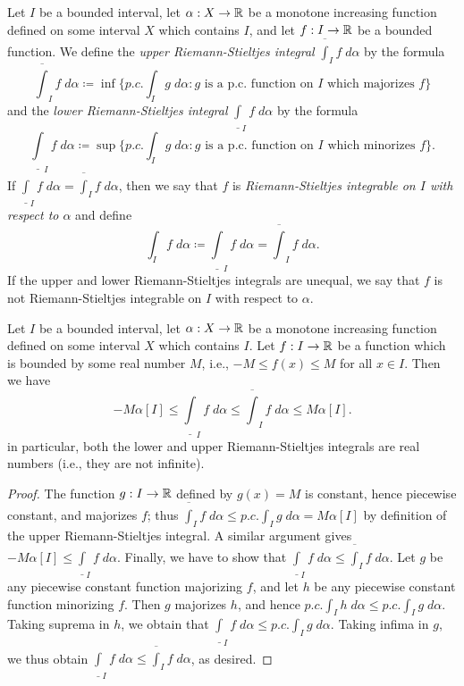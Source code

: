 \begin{ac}\label{ac:11.8.8}
  Let \(I\) be a bounded interval, let \(\alpha : X \to \mathbb{R}\) be a monotone increasing function defined on some interval \(X\) which contains \(I\), and let \(f : I \to \mathbb{R}\) be a bounded function.
  We define the \emph{upper Riemann-Stieltjes integral} \(\overline{\int}_I f \; d \alpha\) by the formula
  \[
    \overline{\int}_I f \; d \alpha \coloneqq \inf\bigg\{p.c. \int_I g \; d \alpha : g \text{ is a p.c. function on \(I\) which majorizes } f\bigg\}
  \]
  and the \emph{lower Riemann-Stieltjes integral} \(\underline{\int}_I f \; d \alpha\) by the formula
  \[
    \underline{\int}_I f \; d \alpha \coloneqq \sup\bigg\{p.c. \int_I g \; d \alpha : g \text{ is a p.c. function on \(I\) which minorizes } f\bigg\}.
  \]
  If \(\underline{\int}_I f \; d \alpha = \overline{\int}_I f \; d \alpha\), then we say that \(f\) is \emph{Riemann-Stieltjes integrable on \(I\) with respect to \(\alpha\)} and define
  \[
    \int_I f \; d \alpha \coloneqq \underline{\int}_I f \; d \alpha = \overline{\int}_I f \; d \alpha.
  \]
  If the upper and lower Riemann-Stieltjes integrals are unequal, we say that \(f\) is not Riemann-Stieltjes integrable on \(I\) with respect to \(\alpha\).
\end{ac}

\begin{ac}\label{ac:11.8.9}
  Let \(I\) be a bounded interval, let \(\alpha : X \to \mathbb{R}\) be a monotone increasing function defined on some interval \(X\) which contains \(I\).
  Let \(f : I \to \mathbb{R}\) be a function which is bounded by some real number \(M\), i.e., \(-M \leq f(x) \leq M\) for all \(x \in I\).
  Then we have
  \[
    -M \alpha[I] \leq \underline{\int}_I f \; d \alpha \leq \overline{\int}_I f \; d \alpha \leq M \alpha[I].
  \]
  in particular, both the lower and upper Riemann-Stieltjes integrals are real numbers (i.e., they are not infinite).
\end{ac}

\begin{proof}
  The function \(g : I \to \mathbb{R}\) defined by \(g(x) = M\) is constant, hence piecewise constant, and majorizes \(f\);
  thus \(\overline{\int}_I f \; d \alpha \leq p.c. \int_I g \; d \alpha = M \alpha[I]\) by definition of the upper Riemann-Stieltjes integral.
  A similar argument gives \(-M \alpha[I] \leq \underline{\int}_I f \; d \alpha\).
  Finally, we have to show that \(\underline{\int}_I f \; d \alpha \leq \overline{\int}_I f \; d \alpha\).
  Let \(g\) be any piecewise constant function majorizing \(f\), and let \(h\) be any piecewise constant function minorizing \(f\).
  Then \(g\) majorizes \(h\), and hence \(p.c. \int_I h \; d \alpha \leq p.c. \int_I g \; d \alpha\).
  Taking suprema in \(h\), we obtain that \(\underline{\int}_I f \; d \alpha \leq p.c. \int_I g \; d \alpha\).
  Taking infima in \(g\), we thus obtain \(\underline{\int}_I f \; d \alpha \leq \overline{\int}_I f \; d \alpha\), as desired.
\end{proof}

